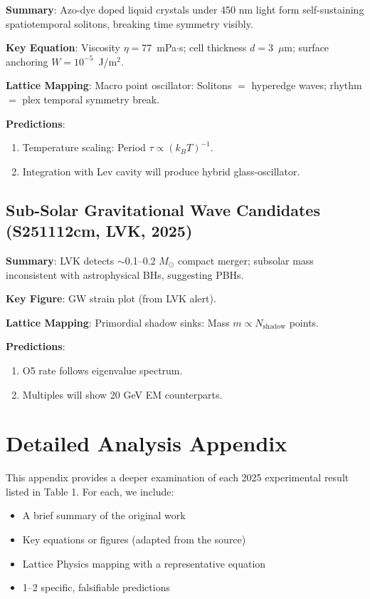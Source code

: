 \documentclass[11pt,a4paper]{article}
\begin{document}
\textbf{Summary}: Azo-dye doped liquid crystals under 450 nm light form self-sustaining spatiotemporal solitons, breaking time symmetry visibly.

\textbf{Key Equation}: Viscosity $\eta = 77$~mPa$\cdot$s; cell thickness $d=3$~$\mu$m; surface anchoring $W=10^{-5}$~J/m$^2$.

\textbf{Lattice Mapping}: Macro point oscillator: Solitons $=$ hyperedge waves; rhythm $=$ plex temporal symmetry break.

\textbf{Predictions}:
\begin{enumerate}
\item Temperature scaling: Period $\tau \propto (k_B T)^{-1}$.
\item Integration with Lev cavity will produce hybrid glass-oscillator.
\end{enumerate}

\subsection{Sub-Solar Gravitational Wave Candidates (S251112cm, LVK, 2025)}

\textbf{Summary}: LVK detects $\sim$0.1--0.2 $M_\odot$ compact merger; subsolar mass inconsistent with astrophysical BHs, suggesting PBHs.

\textbf{Key Figure}: GW strain plot (from LVK alert).

\textbf{Lattice Mapping}: Primordial shadow sinks: Mass $m \propto N_{\mathrm{shadow}}$ points.

\textbf{Predictions}:
\begin{enumerate}
\item O5 rate follows eigenvalue spectrum.
\item Multiples will show 20 GeV EM counterparts.
\end{enumerate}


\appendix

\section{Detailed Analysis Appendix}

This appendix provides a deeper examination of each 2025 experimental result listed in Table 1. For each, we include:
\begin{itemize}
\item A brief summary of the original work
\item Key equations or figures (adapted from the source)
\item Lattice Physics mapping with a representative equation
\item 1--2 specific, falsifiable predictions
\end{itemize}
\end{document}
